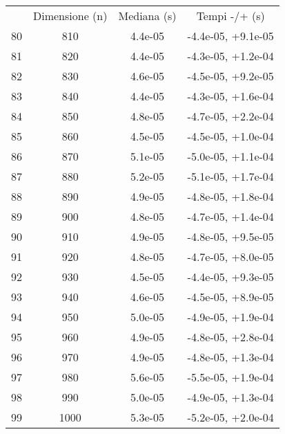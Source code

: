 \begin{table}
\centering
\begin{adjustbox}{width=1\textwidth/2}
\begin{tabular}{|c|c|c|c|}
\hline
 & Dimensione (n) & Mediana (s) & Tempi -/+ (s) \\
80 & 810 & 4.4e-05 & -4.4e-05, +9.1e-05 \\
\cline{1-4}
81 & 820 & 4.4e-05 & -4.3e-05, +1.2e-04 \\
\cline{1-4}
82 & 830 & 4.6e-05 & -4.5e-05, +9.2e-05 \\
\cline{1-4}
83 & 840 & 4.4e-05 & -4.3e-05, +1.6e-04 \\
\cline{1-4}
84 & 850 & 4.8e-05 & -4.7e-05, +2.2e-04 \\
\cline{1-4}
85 & 860 & 4.5e-05 & -4.5e-05, +1.0e-04 \\
\cline{1-4}
86 & 870 & 5.1e-05 & -5.0e-05, +1.1e-04 \\
\cline{1-4}
87 & 880 & 5.2e-05 & -5.1e-05, +1.7e-04 \\
\cline{1-4}
88 & 890 & 4.9e-05 & -4.8e-05, +1.8e-04 \\
\cline{1-4}
89 & 900 & 4.8e-05 & -4.7e-05, +1.4e-04 \\
\cline{1-4}
90 & 910 & 4.9e-05 & -4.8e-05, +9.5e-05 \\
\cline{1-4}
91 & 920 & 4.8e-05 & -4.7e-05, +8.0e-05 \\
\cline{1-4}
92 & 930 & 4.5e-05 & -4.4e-05, +9.3e-05 \\
\cline{1-4}
93 & 940 & 4.6e-05 & -4.5e-05, +8.9e-05 \\
\cline{1-4}
94 & 950 & 5.0e-05 & -4.9e-05, +1.9e-04 \\
\cline{1-4}
95 & 960 & 4.9e-05 & -4.8e-05, +2.8e-04 \\
\cline{1-4}
96 & 970 & 4.9e-05 & -4.8e-05, +1.3e-04 \\
\cline{1-4}
97 & 980 & 5.6e-05 & -5.5e-05, +1.9e-04 \\
\cline{1-4}
98 & 990 & 5.0e-05 & -4.9e-05, +1.3e-04 \\
\cline{1-4}
99 & 1000 & 5.3e-05 & -5.2e-05, +2.0e-04 \\
\cline{1-4}
\end{tabular}
\end{adjustbox}
\end{table}

